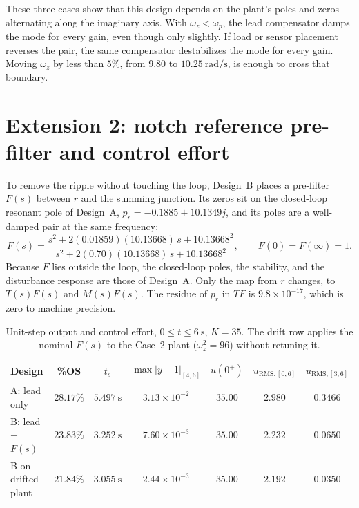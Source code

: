 \documentclass[12pt,a4paper]{article}
\begin{document}
These three cases show that this design depends on the plant's poles and zeros alternating along the imaginary axis.
With \(\omega_z<\omega_p\), the lead compensator damps the mode for every gain, even though only slightly.
If load or sensor placement reverses the pair, the same compensator destabilizes the mode for every gain.
Moving \(\omega_z\) by less than \(5\%\), from \(9.80\) to \(10.25~\mathrm{rad/s}\), is enough to cross that boundary.

\section{Extension 2: notch reference pre-filter and control effort}

To remove the ripple without touching the loop, Design~B places a pre-filter \(F(s)\) between \(r\) and the summing junction.
Its zeros sit on the closed-loop resonant pole of Design~A, \(p_r=-0.1885+10.1349j\), and its poles are a well-damped pair at the same frequency:
\begin{equation}
  F(s)=\frac{s^2+2(0.01859)(10.13668)\,s+10.13668^2}{s^2+2(0.70)(10.13668)\,s+10.13668^2},
  \qquad F(0)=F(\infty)=1 .
  \label{eq:F}
\end{equation}
Because \(F\) lies outside the loop, the closed-loop poles, the stability, and the disturbance response are those of Design~A.
Only the map from \(r\) changes, to \(T(s)F(s)\) and \(M(s)F(s)\).
The residue of \(p_r\) in \(TF\) is \(9.8\times10^{-17}\), which is zero to machine precision.

\begin{table}[H]
  \centering
  \caption{Unit-step output and control effort, \(0\le t\le 6~\mathrm{s}\), \(K=35\). The drift row applies the nominal \(F(s)\) to the Case~2 plant (\(\omega_z^2=96\)) without retuning it.}
  \label{tab:pf}
  \small
  \setlength{\tabcolsep}{4pt}
  \begin{tabular}{lcccccc}
    \toprule
    Design & \%OS & \(t_s\) & \(\max|y-1|_{[4,6]}\) & \(u(0^+)\) & \(u_{\mathrm{RMS},[0,6]}\) & \(u_{\mathrm{RMS},[3,6]}\) \\
    \midrule
    A: lead only & \(28.17\%\) & \(5.497~\mathrm{s}\) & \(3.13\times10^{-2}\) & \(35.00\) & \(2.980\) & \(0.3466\) \\
    B: lead \(+\) \(F(s)\) & \(23.83\%\) & \(3.252~\mathrm{s}\) & \(7.60\times10^{-3}\) & \(35.00\) & \(2.232\) & \(0.0650\) \\
    B on drifted plant & \(21.84\%\) & \(3.055~\mathrm{s}\) & \(2.44\times10^{-3}\) & \(35.00\) & \(2.192\) & \(0.0350\) \\
    \bottomrule
  \end{tabular}
\end{table}
\end{document}
